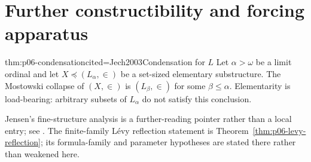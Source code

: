 
\section{Further constructibility and forcing apparatus}

\begin{hbtheorem}{thm:p06-condensation}{cited=Jech2003}{Condensation for \(L\)}
Let \(\alpha>\omega\) be a limit ordinal and let
  \(X\preccurlyeq(L_\alpha,\in)\) be a set-sized elementary substructure.  The
Mostowski collapse of \((X,\in)\) is \((L_\beta,\in)\) for some
\(\beta\leq\alpha\).  Elementarity is load-bearing: arbitrary subsets of
\(L_\alpha\) do not satisfy this conclusion.
\end{hbtheorem}

Jensen's fine-structure analysis is a further-reading pointer rather than a
local entry; see \cite{Devlin1984}.  The finite-family L\'evy reflection statement is
Theorem~\ref{thm:p06-levy-reflection}; its formula-family and parameter
hypotheses are stated there rather than weakened here.

